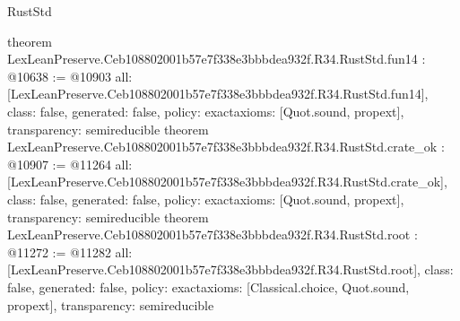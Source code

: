 \begin{lexlean}{RustStd}
\begin{coremodule}
{}
theorem LexLeanPreserve.Ceb108802001b57e7f338e3bbbdea932f.R34.RustStd.fun14 : @10638 := @10903 {
  all: [LexLeanPreserve.Ceb108802001b57e7f338e3bbbdea932f.R34.RustStd.fun14],
  class: false,
  generated: false,
  policy: exact{axioms: [Quot.sound, propext]},
  transparency: semireducible
}
theorem LexLeanPreserve.Ceb108802001b57e7f338e3bbbdea932f.R34.RustStd.crate_ok : @10907 := @11264 {
  all: [LexLeanPreserve.Ceb108802001b57e7f338e3bbbdea932f.R34.RustStd.crate_ok],
  class: false,
  generated: false,
  policy: exact{axioms: [Quot.sound, propext]},
  transparency: semireducible
}
theorem LexLeanPreserve.Ceb108802001b57e7f338e3bbbdea932f.R34.RustStd.root : @11272 := @11282 {
  all: [LexLeanPreserve.Ceb108802001b57e7f338e3bbbdea932f.R34.RustStd.root],
  class: false,
  generated: false,
  policy: exact{axioms: [Classical.choice, Quot.sound, propext]},
  transparency: semireducible
}


\end{coremodule}
\end{lexlean}
